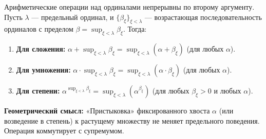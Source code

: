 \documentclass[11pt, a4paper]{extarticle}
\newcommand{\be}{\beta}
\begin{document}
\begin{theorem}
Арифметические операции над ординалами непрерывны по второму аргументу.
Пусть $\lambda$ — предельный ординал, и $\{\beta_\xi\}_{\xi < \lambda}$ — возрастающая последовательность ординалов с пределом $\beta = \sup_{\xi < \lambda} \beta_\xi$. Тогда:
\begin{enumerate}
    \item \textbf{Для сложения:} $\alpha + \sup_{\xi < \lambda} \beta_\xi = \sup_{\xi < \lambda} (\alpha + \beta_\xi)$ (для любых $\alpha$).
    \item \textbf{Для умножения:} $\alpha \cdot \sup_{\xi < \lambda} \beta_\xi = \sup_{\xi < \lambda} (\alpha \cdot \beta_\xi)$ (для любых $\alpha$).
    \item \textbf{Для степени:} $\alpha^{\sup_{\xi < \lambda} \beta_\xi} = \sup_{\xi < \lambda} (\alpha^{\beta_\xi})$ (для любых $\be_\xi>0$ и любых $\alpha$).
\end{enumerate}
\textbf{Геометрический смысл:} «Пристыковка» фиксированного хвоста $\alpha$ (или возведение в степень) к растущему множеству не меняет предельного поведения. Операция коммутирует с супремумом.
\end{theorem}
\end{document}
